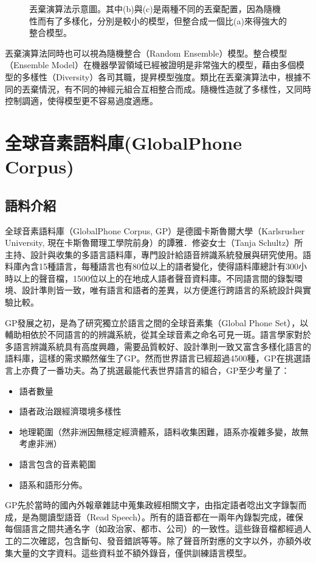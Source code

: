 \begin{figure}
\caption{丟棄演算法示意圖。其中(b)與(c)是兩種不同的丟棄配置，因為隨機性而有了多樣化，分別是較小的模型，但整合成一個比(a)來得強大的整合模型。}
\end{figure}

丟棄演算法同時也可以視為隨機整合（Random Ensemble）模型。整合模型（Ensemble Model）在機器學習領域已經被證明是非常強大的模型，藉由多個模型的多樣性（Diversity）各司其職，提昇模型強度。類比在丟棄演算法中，根據不同的丟棄情況，有不同的神經元組合互相整合而成。隨機性造就了多樣性，又同時控制調適，使得模型更不容易過度適應。
\section{全球音素語料庫(GlobalPhone Corpus)}
\subsection{語料介紹}
全球音素語料庫（GlobalPhone Corpus, GP）是德國卡斯魯爾大學（Karlsrusher University, 現在卡斯魯爾理工學院前身）的譚雅．修姿女士（Tanja Schultz）所主持、設計與收集的多語言語料庫，專門設計給語音辨識系統發展與研究使用。語料庫內含15種語言，每種語言也有80位以上的語者變化，使得語料庫總計有300小時以上的聲音檔，1500位以上的在地成人語者聲音資料庫。不同語言間的錄製環境、設計準則皆一致，唯有語言和語者的差異，以方便進行跨語言的系統設計與實驗比較。

GP發展之初，是為了研究獨立於語言之間的全球音素集（Global Phone Set），以輔助相依於不同語言的的辨識系統，從其全球音素之命名可見一斑。語言學家對於多語言辨識系統具有高度興趣，需要品質較好、設計準則一致又富含多樣化語言的語料庫，這樣的需求顯然催生了GP。然而世界語言已經超過4500種，GP在挑選語言上亦費了一番功夫。為了挑選最能代表世界語言的組合，GP至少考量了：
\begin{itemize}
\itemsep -2pt 
 \item 語者數量
 \item 語者政治跟經濟環境多樣性
 \item 地理範圍（然非洲因無穩定經濟體系，語料收集困難，語系亦複雜多變，故無考慮非洲）
 \item 語言包含的音素範圍
 \item 語系和語形分佈。
\end{itemize}
GP先於當時的國內外報章雜誌中蒐集政經相關文字，由指定語者唸出文字錄製而成，是為閱讀型語音（Read Speech）。所有的語音都在一兩年內錄製完成，確保每個語言之間共通名字（如政治家、都市、公司）的一致性。這些錄音檔都經過人工的二次確認，包含斷句、發音錯誤等等。除了聲音所對應的文字以外，亦額外收集大量的文字資料。這些資料並不額外錄音，僅供訓練語言模型。


